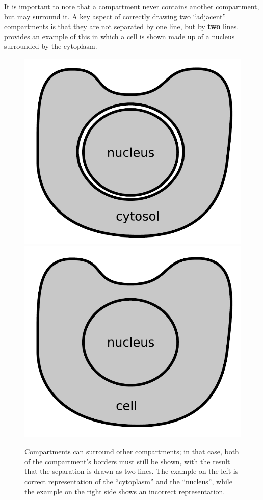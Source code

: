 It is important to note that a compartment never contains another compartment, but may surround it.  A key aspect of correctly drawing two ``adjacent'' compartments is that they are not separated by one line, but by \textbf{two} lines.   provides an example of this in which a cell is shown made up of a nucleus surrounded by the cytoplasm.

\begin{figure}[H]
  \centering
  \includegraphics[scale = 0.4]{examples/compartment-cell}
 \includegraphics[scale = 0.4]{examples/compartment-cell-wrong}
  \caption{Compartments can surround other compartments; in that case, both of the compartment's borders must still be shown, with the result that the separation is drawn as two lines. The example on the left is correct representation of the ``cytoplasm'' and the ``nucleus'', while the example on the right side shows an incorrect representation. }
  \label{fig:two-comp}
\end{figure}

